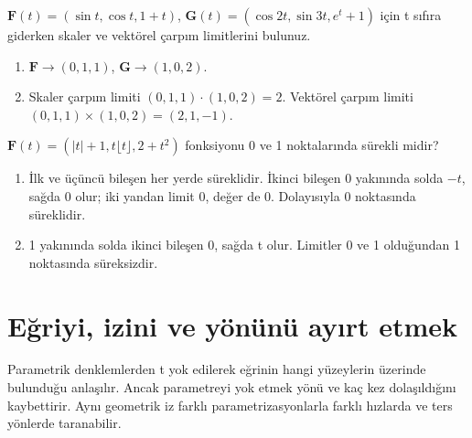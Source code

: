 \begin{tcolorbox}[title={Örnek 3.3 | Defterdeki limit işlemleri},colframe=accent]\(\mathbf F(t)=(\sin t,\cos t,1+t)\), \(\mathbf G(t)=(\cos2t,\sin3t,e^t+1)\) için t sıfıra giderken skaler ve vektörel çarpım limitlerini bulunuz.
\par{}\end{tcolorbox}
\begin{tcolorbox}[title={Adım adım çözüm},colback=green!3!white,colframe=green]\begin{enumerate}
\item \(\mathbf F\to(0,1,1)\), \(\mathbf G\to(1,0,2)\).
\item Skaler çarpım limiti \((0,1,1)\cdot(1,0,2)=2\). Vektörel çarpım limiti \((0,1,1)\times(1,0,2)=(2,1,-1)\).
\end{enumerate}\end{tcolorbox}
\begin{tcolorbox}[title={Örnek 3.4 | Tam kısım içeren süreklilik},colframe=accent]\(\mathbf F(t)=(|t|+1,t\lfloor t\rfloor,2+t^2)\) fonksiyonu 0 ve 1 noktalarında sürekli midir?
\par{}\end{tcolorbox}
\begin{tcolorbox}[title={Adım adım çözüm},colback=green!3!white,colframe=green]\begin{enumerate}
\item İlk ve üçüncü bileşen her yerde süreklidir. İkinci bileşen 0 yakınında solda \(-t\), sağda 0 olur; iki yandan limit 0, değer de 0. Dolayısıyla 0 noktasında süreklidir.
\item 1 yakınında solda ikinci bileşen 0, sağda t olur. Limitler 0 ve 1 olduğundan 1 noktasında süreksizdir.
\end{enumerate}\end{tcolorbox}
\section{Eğriyi, izini ve yönünü ayırt etmek}
Parametrik denklemlerden t yok edilerek eğrinin hangi yüzeylerin üzerinde bulunduğu anlaşılır. Ancak parametreyi yok etmek yönü ve kaç kez dolaşıldığını kaybettirir. Aynı geometrik iz farklı parametrizasyonlarla farklı hızlarda ve ters yönlerde taranabilir.

